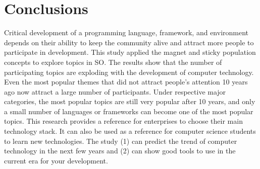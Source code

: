 \documentclass[conference]{IEEEtran}
\begin{document}


\section{Conclusions}
Critical development of a programming language, framework, and environment depends on their ability to keep the community alive and attract more people to participate in development. This study applied the magnet and sticky population concepts to explore topics in SO. The results show that the number of participating topics are exploding with the development of computer technology. Even the most popular themes that did not attract people’s attention 10 years ago now attract a large number of participants. Under respective major categories, the most popular topics are still very popular after 10 years, and only a small number of languages or frameworks can become one of the most popular topics. This research provides a reference for enterprises to choose their main technology stack. It can also be used as a reference for computer science students to learn new technologies. The study (1) can predict the trend of computer technology in the next few years and (2) can show good tools to use in the current era for your development.



\end{document}
